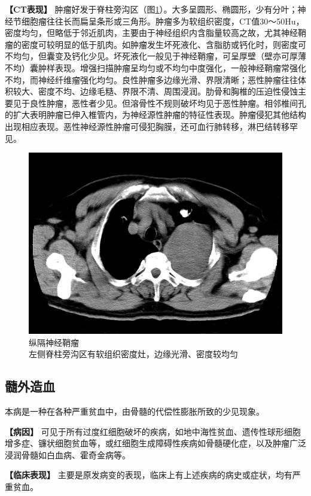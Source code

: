 \textbf{【CT表现】}
肿瘤好发于脊柱旁沟区（图\ref{fig9-56}）。大多呈圆形、椭圆形，少有分叶；神经节细胞瘤往往长而扁呈条形或三角形。肿瘤多为软组织密度，CT值30～50Hu，密度均匀，但略低于邻近肌肉，主要由于神经组织内含脂量较高之故，尤其神经鞘瘤的密度可较明显的低于肌肉。如肿瘤发生坏死液化、含脂肪或钙化时，则密度可不均匀，但囊变及钙化少见。坏死液化一般见于神经鞘瘤，可呈厚壁（壁亦可厚薄不均）囊肿样表现。增强扫描肿瘤呈均匀或不均匀中度强化，一般神经鞘瘤常强化不均，而神经纤维瘤强化均匀。良性肿瘤多边缘光滑、界限清晰；恶性肿瘤往往体积较大、密度不均、边缘毛糙、界限不清、周围浸润。肋骨和胸椎的压迫性侵蚀主要见于良性肿瘤，恶性者少见。但溶骨性不规则破坏均见于恶性肿瘤。相邻椎间孔的扩大表明肿瘤已伸入椎管内，为神经源性肿瘤的特征性表现。肿瘤侵犯其他结构出现相应表现。恶性神经源性肿瘤可侵犯胸膜，还可血行肺转移，淋巴结转移罕见。

\begin{figure}[!htbp]
 \centering
 \includegraphics[width=.7\textwidth,height=\textheight,keepaspectratio]{./images/Image00259.jpg}
 \captionsetup{justification=centering}
 \caption{纵隔神经鞘瘤\\{\small 左侧脊柱旁沟区有软组织密度灶，边缘光滑、密度较均匀}}
 \label{fig9-56}
  \end{figure} 

\subsection{髓外造血}

本病是一种在各种严重贫血中，由骨髓的代偿性膨胀所致的少见现象。

\textbf{【病因】}
可见于所有过度红细胞破坏的疾病，如地中海性贫血、遗传性球形细胞增多症、镰状细胞贫血等，或红细胞生成障碍性疾病如骨髓硬化症，以及肿瘤广泛浸润骨髓如白血病、霍奇金病等。

\textbf{【临床表现】}
主要是原发病变的表现，临床上有上述疾病的病史或症状，均有严重贫血。

